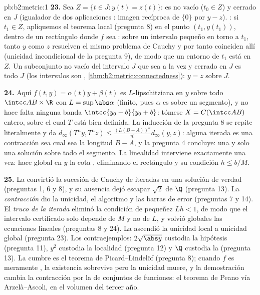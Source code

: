 \begin{solution}{pb:b2:metric:1}
\textbf{23.} Sea $Z = \{t \in J : y(t) = z(t)\}$: es no vacío
($t_0 \in Z$) y cerrado en $J$ (igualador de dos aplicaciones
: imagen recíproca de $\{0\}$ por $y - z$). :
si $t_1 \in Z$, apliquemos el teorema local (pregunta 8) en el
punto $(t_1, y(t_1))$, dentro de un rectángulo donde $f$ sea
: sobre un intervalo pequeño en torno a $t_1$, tanto
$y$ como $z$ resuelven el mismo problema de Cauchy y por tanto
coinciden allí (unicidad incondicional de la pregunta 9), de modo
que un entorno de $t_1$ está en $Z$. Un subconjunto no vacío del
intervalo $J$ que sea a la vez  y cerrado en $J$ es todo
$J$ (los intervalos son ,
\cref{thm:b2:metric:connectedness}): $y = z$ sobre $J$.

\textbf{24.} Aquí $f(t, y) = \alpha(t)y + \beta(t)$ es
$L$-lipschitziana en $y$ sobre todo $\intcc AB \times \R$ con $L =
\sup\abs\alpha$ (finito, pues $\alpha$ es  sobre un
segmento), y no hace falta ninguna banda $\intcc{y_0 - b}{y_0 +
b}$: tómese $X = C(\intcc AB)$ entero, sobre el cual $T$ está bien
definida. La inducción de la pregunta 8 se repite literalmente y
da $d_\infty(T^ny, T^nz) \leq \frac{(L(B - A))^n}{n!}d_\infty(y,
z)$: alguna iterada es una contracción sea cual sea la longitud $B
- A$, y la pregunta 4 concluye: una y solo una solución sobre todo
el segmento. La linealidad interviene exactamente una vez: hace
global en $y$ la cota , eliminando el rectángulo y su
condición $h \leq b/M$.

\textbf{25.} La \emph{} convirtió la sucesión de Cauchy
de iteradas en una solución de verdad (preguntas 1, 6 y 8), y su
ausencia dejó escapar $\sqrt2$ de $\Q$ (pregunta 13). La
\emph{contracción} dio la unicidad, el algoritmo y las barras de
error (preguntas 7 y 14). El \emph{truco de la iterada} eliminó la
condición de pequeñez $Lh < 1$, de modo que el intervalo
certificado solo depende de $M$ y no de $L$, y volvió globales las
ecuaciones lineales (preguntas 8 y 24). La \emph{}
ascendió la unicidad local a unicidad global (pregunta 23). Los
contraejemplos: $2\sqrt{\abs y}$ custodia la hipótesis
 (pregunta 11), $y^2$ custodia la localidad
(pregunta 12) y $\Q$ custodia la  (pregunta 13). La
cumbre es el teorema de Picard--Lindelöf (pregunta 8); cuando $f$
es meramente , la existencia sobrevive pero la unicidad
muere, y la demostración cambia la contracción por la 
de conjuntos de funciones: el teorema de Peano vía Arzelà--Ascoli,
en el volumen del tercer año.
\end{solution}
